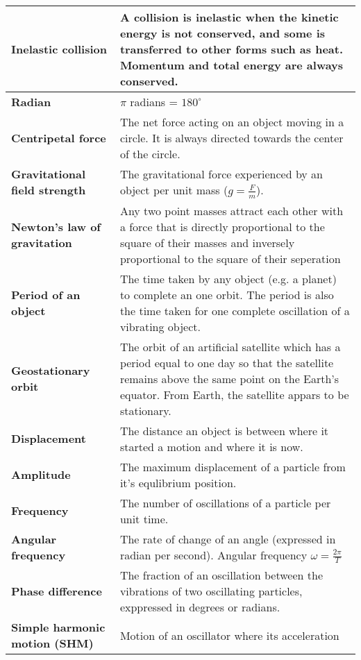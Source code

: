 \documentclass{article}
\begin{document}
\begin{longtable}{>{\bf\centering\arraybackslash}p{1in} 
  p{\textwidth-4\tabcolsep-1in}}
  Inelastic collision & A collision is inelastic when the kinetic
    energy is not conserved, and some is transferred to other forms such as
    heat. Momentum and total energy are always conserved.\\ \midrule
  Radian & $\pi$ radians = $180^\circ$\\ %
  Centripetal force & The net force acting on an object moving in a circle. It 
    is always directed towards the center of the circle. \\ \midrule
  Gravitational field strength & The gravitational force 
    experienced by an object per unit mass ($g = \frac{F}{m}$).\\ \midrule
  Newton's law of gravitation & Any two point masses attract each other with a
    force that is directly proportional to the square of their masses and
    inversely proportional to the square of their seperation\\ \midrule
  Period of an object & The time taken by any object (e.g. a planet) to complete
    an one orbit. \newline \newline The period is also the time taken for one
    complete oscillation of a vibrating object.\\ \midrule
  Geostationary orbit & The orbit of an artificial satellite which has a period
    equal to one day so that the satellite remains above the same point on the
    Earth's equator. \newline \newline From Earth, the satellite appars to be
    stationary.\\ \midrule
  Displacement & The distance an object is between where it started a motion and
    where it is now.\\ \midrule
  Amplitude & The maximum displacement of a particle from it's equlibrium
    position.\\ \midrule
  Frequency & The number of oscillations of a particle per unit time.\\ \midrule
  Angular frequency & The rate of change of an angle (expressed in radian per 
    second). \newline \newline Angular frequency $\omega = \frac{2\pi}{T}$\\ 
    \midrule
  Phase difference & The fraction of an oscillation between the vibrations of
    two oscillating particles, exppressed in degrees or radians.\\ \midrule
  Simple harmonic motion (SHM) & Motion of an oscillator where its acceleration

\end{longtable}
\end{document}
